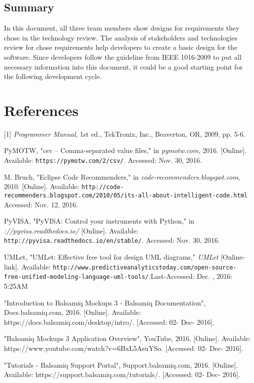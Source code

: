 \documentclass [10pt]{article}
\begin{document}
\subsection{Summary}
In this document, all three team members show designs for requirements they chose in the technology review. The analysis of stakeholders and technologies review for chose requirements help developers to create a basic design for the software. Since developers follow the guideline from IEEE 1016-2009 to put all necessary information into this document, it could be a good starting point for the following development cycle.

\newpage
\section{References}
 [1] \textit{Programmer Manual}, 1st ed., TekTronix, Inc., Beaverton, OR, 2009, pp. 5-6. \par
 [2] PyMOTW, "csv – Comma-separated value files," in \textit{pymotw.com}, 2016. [Online]. Available: \texttt{https://pymotw.com/2/csv/}. Accessed: Nov. 30, 2016. \par
 [3] M. Bruch, "Eclipse Code Recommenders," in \textit{code-recommenders.blogspot.com}, 2010. [Online]. Available: \texttt{http://code-recommenders.blogspot.com/2010/05/its-all-about-intelligent-code.html} Accessed: Nov. 12, 2016.\par
 [4] PyVISA, "PyVISA: Control your instruments with Python," in \textit{://pyvisa.readthedocs.io/} [Online]. Available: \texttt{http://pyvisa.readthedocs.io/en/stable/}. Accessed: Nov. 30, 2016.\par
 [5] UMLet, "UMLet: Effective free tool for design UML diagrams," \textit{UMLet} [Online-link]. Available: \texttt{http://www.predictiveanalyticstoday.com/open-source-free-unified-modeling-language-uml-tools/}.Last-Accessed: Dec. , 2016: 5:25AM\par
 [6] "Introduction to Balsamiq Mockups 3 - Balsamiq Documentation", Docs.balsamiq.com, 2016. [Online]. Available: https://docs.balsamiq.com/desktop/intro/. [Accessed: 02- Dec- 2016]. \par
 [7] "Balsamiq Mockups 3 Application Overview", YouTube, 2016. [Online]. Available: https://www.youtube.com/watch?v=6BxL5AsuYSo. [Accessed: 02- Dec- 2016]. \par
 [8] "Tutorials - Balsamiq Support Portal", Support.balsamiq.com, 2016. [Online]. Available: https://support.balsamiq.com/tutorials/. [Accessed: 02- Dec- 2016]. \par
\end{document}
